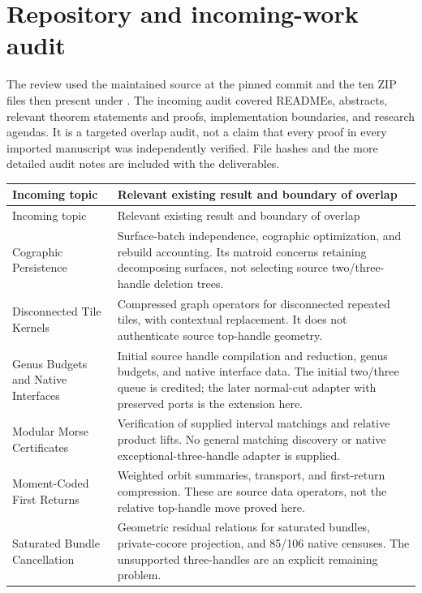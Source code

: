 \section{Repository and incoming-work audit}
\label{sec:source-audit}

The review used the maintained source at the pinned commit and the ten ZIP
files then present under . The incoming audit
covered READMEs, abstracts, relevant theorem statements and proofs,
implementation boundaries, and research agendas. It is a targeted overlap
audit, not a claim that every proof in every imported manuscript was
independently verified. File hashes and the more detailed audit notes are
included with the deliverables.

\begin{longtable}{@{}p{}p{}@{}}
\toprule
Incoming topic & Relevant existing result and boundary of overlap\\
\midrule
\endfirsthead
\toprule
Incoming topic & Relevant existing result and boundary of overlap\\
\midrule
\endhead
\bottomrule
\endfoot
Cographic Persistence
& Surface-batch independence, cographic optimization, and rebuild accounting.
Its matroid concerns retaining decomposing surfaces, not selecting source
two/three-handle deletion trees.\\[4pt]
Disconnected Tile Kernels
& Compressed graph operators for disconnected repeated tiles, with contextual
replacement. It does not authenticate source top-handle geometry.\\[4pt]
Genus Budgets and Native Interfaces
& Initial source handle compilation and reduction, genus budgets, and native
interface data. The initial two/three queue is credited; the later normal-cut
adapter with preserved ports is the extension here.\\[4pt]
Modular Morse Certificates
& Verification of supplied interval matchings and relative product lifts.
No general matching discovery or native exceptional-three-handle adapter is
supplied.\\[4pt]
Moment-Coded First Returns
& Weighted orbit summaries, transport, and first-return compression. These
are source data operators, not the relative top-handle move proved here.\\[4pt]
Saturated Bundle Cancellation
& Geometric residual relations for saturated bundles, private-cocore
projection, and 85/106 native censuses. The unsupported three-handles are an
explicit remaining problem.\\[4pt]

\end{longtable}
